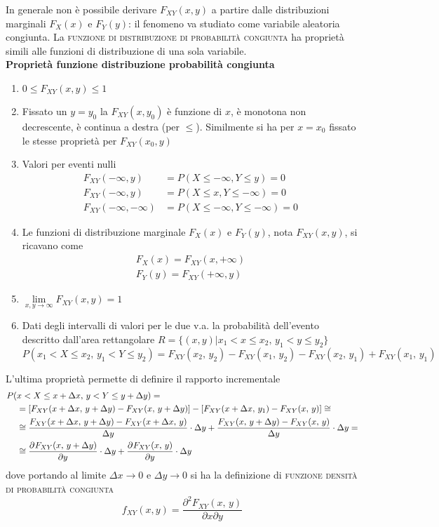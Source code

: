 In generale non è possibile derivare $F_{XY}(x,y)$ a partire dalle distribuzioni marginali $F_X(x)$ e $F_Y(y)$: il fenomeno va studiato come variabile aleatoria congiunta.
La \textsc{funzione di distribuzione di probabilità congiunta} ha proprietà simili alle funzioni di distribuzione di una sola variabile.\\

\textbf{Proprietà funzione distribuzione probabilità congiunta}
\begin{enumerate}
\item $0\leq F_{XY}(x,y)\leq 1$
\item Fissato un $y=y_0$ la $F_{XY}(x,y_0)$ è funzione di $x$, è monotona non decrescente, è continua a destra (per $\leq$).
Similmente si ha per $x=x_0$ fissato le stesse proprietà per $F_{XY}(x_0,y)$
\item Valori per eventi nulli
\[
	\begin{split}
		F_{XY}(-\infty,y)&=P(X\leq -\infty,Y\leq y)=0\\
		F_{XY}(-\infty,y)&=P(X\leq x,Y\leq -\infty)=0\\
		F_{XY}(-\infty,-\infty)&=P(X\leq -\infty,Y\leq -\infty)=0
	\end{split}
\]
\item Le funzioni di distribuzione marginale $F_X(x)$ e $F_Y(y)$, nota $F_{XY}(x,y)$, si ricavano come
\[
	\begin{split}
		F_X(x)=F_{XY}(x,+\infty)\\F_Y(y)=F_{XY}(+\infty,y)
	\end{split}
\]
\item $\lim\limits_{x,y\to\infty}F_{XY}(x,y)=1$
\item Dati degli intervalli di valori per le due v.a. la probabilità dell'evento descritto dall'area rettangolare $R=\{(x,y)|x_1<x\leq x_2,\, y_1<y\leq y_2\}$
\[
	P(x_1<X\leq x_2,\,y_1<Y\leq y_2)= F_{XY}(x_2,\,y_2)-F_{XY}(x_1,\,y_2)-F_{XY}(x_2,\,y_1)+F_{XY}(x_1,\,y_1)
\]
\end{enumerate}
L'ultima proprietà permette di definire il rapporto incrementale
\[
	\begin{split}
		P(&x<X\leq x+\Delta x,\,y<Y\leq y+\Delta y)=\\
		&=\left[F_{XY}(x+\Delta x,\,y+\Delta y)-F_{XY}(x,\,y+\Delta y)\right]-\left[F_{XY}(x+\Delta x,\,y_1)-F_{XY}(x,\,y)\right]\cong\\
		&\cong\frac{F_{XY}(x+\Delta x,\,y+\Delta y)-F_{XY}(x+\Delta x,\,y)}{\Delta y}\cdot\Delta y+\frac{F_{XY}(x,\,y+\Delta y)-F_{XY}(x,\,y)}{\Delta y}\cdot\Delta y=\\
		&\cong\frac{\partial^{}F_{XY}(x,\,y+\Delta y)}{\partial y^{}}\cdot\Delta y+\frac{\partial^{}F_{XY}(x,\,y)}{\partial y^{}}\cdot\Delta y
	\end{split}
\]
dove portando al limite $\Delta x\to 0$ e $\Delta y\to 0$ si ha la definizione di \textsc{funzione densità di probabilità congiunta}
\begin{equation}
	f_{XY}(x,y)=\frac{\partial^2 F_{XY}(x,\,y)}{\partial x\partial y}
\end{equation}

